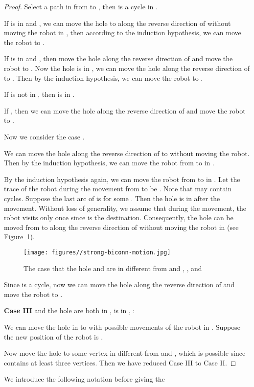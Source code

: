 \documentclass{article}
\begin{document}
\begin{proof}
Select a path  in  from  to , then
 is a cycle in .

If  is in  and , we can move the hole
to  along the reverse direction of  without
moving the robot in , then according to the induction hypothesis,
we can move the robot to .

If  is in  and , then move the hole
along the reverse direction of  and move the robot
to . Now the hole is in , we can move the hole
along the reverse direction of  to . Then by the
induction hypothesis, we can move the robot to .

If  is not in , then  is in .

If , then we can move the hole along the reverse
direction of  and move the robot to .

Now we consider the case .

We can move the hole along the reverse direction of  to
 without moving the robot. Then by the induction
hypothesis, we can move the robot from  to  in
.

By the induction hypothesis again, we can move the robot from
 to  in . Let the trace of the robot
during the movement from  to  be .
Note that  may contain cycles. Suppose the last arc of
 is  for some . Then the hole is in 
after the movement. Without loss of generality, we assume that
during the movement, the robot visits  only once since
 is the destination. Consequently, the hole can be moved
from  to  along the reverse direction of 
without moving the robot in  (see
Figure~\ref{fig:strong-biconn-motion}).

\begin{figure}[ht]
\centering
  \texttt{[image: figures//strong-biconn-motion.jpg]}
  \caption{The case that the hole and  are in  different from  and , , and }\label{fig:strong-biconn-motion}
\end{figure}

Since  is a cycle, now we can move the hole along
the reverse direction of  and move the robot to .

\textbf{Case III}  and the hole are both in ,  is
in , :

We can move the hole in  to  with possible
movements of the robot in . Suppose the new position of
the robot is .

Now move the hole to some vertex in  different from
 and , which is possible since 
contains at least three vertices. Then we have reduced Case III to
Case II.
\end{proof}
\noindent We introduce the following notation before giving the
\end{document}
